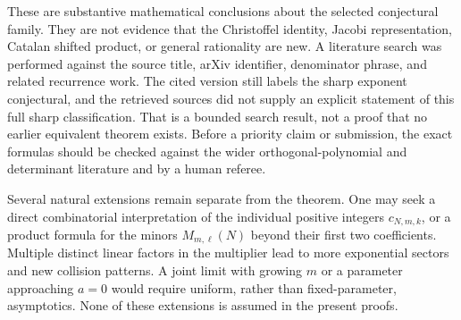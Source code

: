 \documentclass[11pt,a4paper]{article}
\numberwithin{equation}{section}
\theoremstyle{definition}
\theoremstyle{remark}
\begin{document}
These are substantive mathematical conclusions about the selected
conjectural family.  They are not evidence that the Christoffel identity,
Jacobi representation, Catalan shifted product, or general rationality
are new.  A literature search was performed against the source title,
arXiv identifier, denominator phrase, and related recurrence work.
The cited version still labels the sharp exponent conjectural, and the
retrieved sources did not supply an explicit statement of this full
sharp classification.  That is a bounded search result, not a proof
that no earlier equivalent theorem exists.  Before a priority claim
or submission, the exact formulas should be checked against the wider
orthogonal-polynomial and determinant literature and by a human referee.

Several natural extensions remain separate from the theorem.  One may
seek a direct combinatorial interpretation of the individual positive
integers $c_{N,m,k}$, or a product formula for the minors
$M_{m,\ell}(N)$ beyond their first two coefficients.  Multiple distinct
linear factors in the multiplier lead to more exponential sectors and
new collision patterns.  A joint limit with growing $m$ or a parameter
approaching $a=0$ would require uniform, rather than fixed-parameter,
asymptotics.  None of these extensions is assumed in the present proofs.

\noindent[Added 28 September 2026, batch 39: the preceding paragraph
describes the report at the state \texttt{fbba58593} against which Part~II
was written.  The extension to several distinct linear factors, and to
repeated factors, is treated in Part~II: for every nonzero polynomial
multiplier the exponential sectors, their exact degrees and nonzero
leading coefficients (Theorems~\ref{rc:thm:main} and~\ref{rc:thm:leading}),
the minimal order off resonance \eqref{rc:eq:R}, an exact detector of the
parameters where it drops (Theorem~\ref{rc:thm:secondary}), and a certified
finite algorithm on that resonance locus (Theorems~\ref{rc:thm:resonant}
and~\ref{rc:thm:finite}).  Part~II gives no short closed classification of
the resonant cancellations; it poses that as a research direction
(Section~\ref{rc:sec:research}).  The other extensions named here remain
open: Part~II does not address a combinatorial interpretation of
$c_{N,m,k}$, a product formula for the minors $M_{m,\ell}(N)$, or joint
limits with growing $m$; and its asymptotics
(Section~\ref{rc:sec:asymptotics}) are for fixed parameters, so a
parameter approaching $a=0$ (a root reaching the endpoint $0$) is among
the uniform endpoint limits it poses, not solves.]
\end{document}
